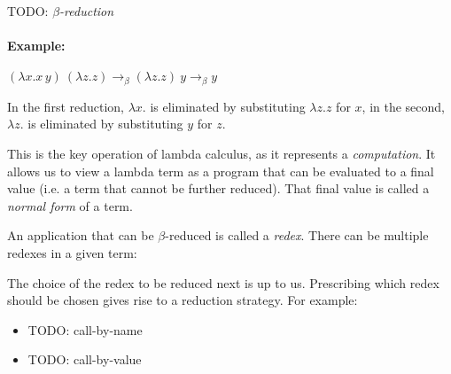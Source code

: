 \documentclass[11pt,twoside,a4paper]{article} %
\begin{document}
TODO: \emph{$\beta$-reduction}

\paragraph{Example:} $(\lambda x.x\,y)\ (\lambda z.z)\longrightarrow_\beta
(\lambda z.z)\ y\longrightarrow_\beta y$

In the first reduction, $\lambda x.$ is eliminated by substituting $\lambda z.z$ 
for $x$, in the second, $\lambda z.$ is eliminated by substituting $y$ for $z$.

This is the key operation of lambda calculus, as it represents a
\emph{computation}. It allows us to view a lambda term as a program that can be
evaluated to a final value (i.e. a term that cannot be further reduced). That
final value is called a \emph{normal form} of a term.

An application that can be $\beta$-reduced is called a \emph{redex}. There can
be multiple redexes in a given term:


The choice of the redex to be reduced next is up to us. Prescribing which redex
should be chosen gives rise to a reduction strategy. For example:
\begin{itemize}
\item TODO: call-by-name
\item TODO: call-by-value
\end{itemize}
\end{document}
